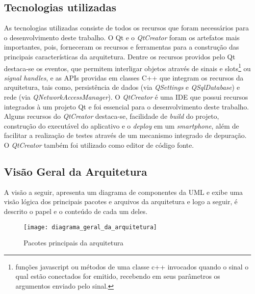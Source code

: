 \subsection{Tecnologias utilizadas}
As tecnologias utilizadas consiste de todos os recursos que foram necessários para o desenvolvimento deste trabalho. O Qt e o \textit{QtCreator} foram os artefatos mais importantes, pois, forneceram os recursos e ferramentas para a construção das principais características da arquitetura. Dentre os recursos providos pelo Qt destaca-se os eventos, que permitem interligar objetos através de sinais e slots\footnote{funções javascript ou métodos de uma classe c++ invocados quando o sinal o qual estão conectados for emitido, recebendo em seus parâmetros os argumentos enviado pelo sinal.} ou \textit{signal handles}, e as APIs providas em classes C++ que integram os recursos da arquitetura, tais como, persistência de dados (via \textit{QSettings} e \textit{QSqlDatabase}) e rede (via \textit{QNetworkAccessManager}). O \textit{QtCreator} é uma IDE que possui recursos integrados à um projeto Qt e foi essencial para o desenvolvimento deste trabalho. Alguns recursos do \textit{QtCreator} destaca-se, facilidade de \textit{build} do projeto, construção do executável do aplicativo e o \textit{deploy} em um \textit{smartphone}, além de facilitar a realização de testes através de um mecanismo integrado de depuração. O \textit{QtCreator} também foi utilizado como editor de código fonte.


\subsection{Visão Geral da Arquitetura}
A visão a seguir, apresenta um diagrama de componentes da UML e exibe uma visão lógica dos principais pacotes e arquivos da arquitetura e logo a seguir, é descrito o papel e o conteúdo de cada um deles.

\begin{figure}[h]
	\texttt{[image: diagrama\_geral\_da\_arquitetura]}
	\centering
	\caption{Pacotes principais da arquitetura}
\end{figure}

